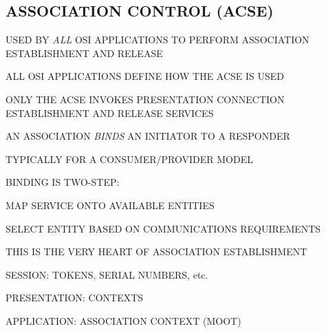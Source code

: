 \begin{bwslide}
\part*	{ASSOCIATION CONTROL (ACSE)}\bf

\begin{nrtc}
\item	USED BY \emph{ALL} OSI APPLICATIONS TO PERFORM ASSOCIATION
	ESTABLISHMENT AND RELEASE

\item	ALL OSI APPLICATIONS DEFINE HOW THE ACSE IS USED

\item	ONLY THE ACSE INVOKES PRESENTATION CONNECTION ESTABLISHMENT AND
	RELEASE SERVICES
\end{nrtc}
\end{bwslide}


\begin{bwslide}

\begin{nrtc}
\item	AN ASSOCIATION \emph{BINDS} AN INITIATOR TO A RESPONDER
    \begin{nrtc}
    \item	TYPICALLY FOR A CONSUMER/PROVIDER MODEL
    \end{nrtc}

\item	BINDING IS TWO-STEP:
    \begin{nrtc}
    \item	MAP SERVICE ONTO AVAILABLE ENTITIES

    \item	SELECT ENTITY BASED ON COMMUNICATIONS REQUIREMENTS
    \end{nrtc}
\end{nrtc}
\end{bwslide}


\begin{bwslide}

\begin{nrtc}
\item	THIS IS THE VERY HEART OF ASSOCIATION ESTABLISHMENT
    \begin{nrtc}
    \item	SESSION: TOKENS, SERIAL NUMBERS, etc.

    \item	PRESENTATION: CONTEXTS

    \item	APPLICATION: ASSOCIATION CONTEXT (MOOT)
    \end{nrtc}
\end{nrtc}
\end{bwslide}


